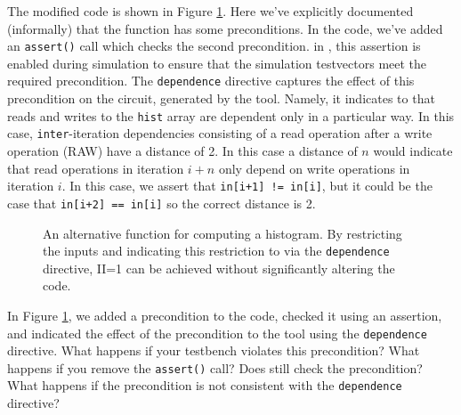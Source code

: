 The modified code is shown in Figure \ref{fig:histogram_dependence}.  Here we've explicitly documented (informally) that the function has some preconditions.  In the code, we've added an \lstinline|assert()| call which checks the second precondition.
in \VHLS, this assertion is enabled during simulation to ensure that the simulation testvectors meet the required precondition.  The \lstinline|dependence| directive captures the effect of this precondition on the circuit, generated by the tool.  Namely, it indicates to \VHLS that reads and writes to the \lstinline|hist| array are dependent only in a particular way.  In this case, \lstinline|inter|-iteration dependencies consisting of a read operation after a write operation (RAW) have a distance of 2.  In this case a distance of $n$ would indicate that read operations in iteration $i+n$ only depend on write operations in iteration $i$.  In this case, we assert that \lstinline|in[i+1] != in[i]|, but it could be the case that \lstinline|in[i+2] == in[i]| so the correct distance is 2.

\begin{figure}

\caption{ An alternative function for computing a histogram.  By restricting the inputs and indicating this restriction to \VHLS via the \lstinline|dependence| directive, II=1 can be achieved without significantly altering the code. }
\label{fig:histogram_dependence}
\end{figure}

\begin{exercise}
In Figure \ref{fig:histogram_dependence}, we added a precondition to the code, checked it using an assertion, and indicated the effect of the precondition to the tool using the \lstinline|dependence| directive.  What happens if your testbench violates this precondition?  What happens if you remove the \lstinline|assert()| call?  Does \VHLS still check the precondition?   What happens if the precondition is not consistent with the \lstinline|dependence| directive?
\end{exercise}

